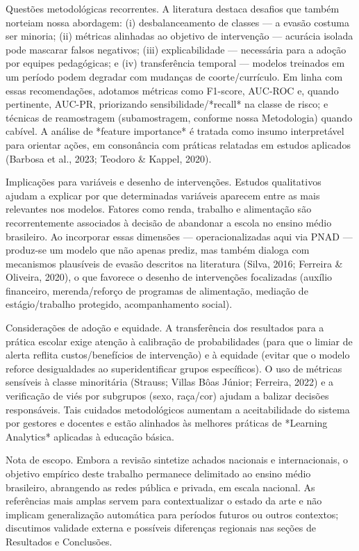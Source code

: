 \documentclass[english, spanish, brazilian]{RBIEarticle} %
\begin{document}
Questões metodológicas recorrentes. A literatura destaca desafios que também norteiam nossa
abordagem: (i) desbalanceamento de classes — a evasão costuma ser minoria; (ii) métricas
alinhadas ao objetivo de intervenção — acurácia isolada pode mascarar falsos negativos; (iii)
explicabilidade — necessária para a adoção por equipes pedagógicas; e (iv) transferência temporal
— modelos treinados em um período podem degradar com mudanças de coorte/currículo. Em linha
com essas recomendações, adotamos métricas como F1-score, AUC-ROC e, quando pertinente,
AUC-PR, priorizando sensibilidade/*recall* na classe de risco; e técnicas de reamostragem
(subamostragem, conforme nossa Metodologia) quando cabível. A análise de *feature importance*
é tratada como insumo interpretável para orientar ações, em consonância com práticas relatadas em
estudos aplicados (Barbosa et al., 2023; Teodoro \& Kappel, 2020).

Implicações para variáveis e desenho de intervenções. Estudos qualitativos ajudam a explicar por
que determinadas variáveis aparecem entre as mais relevantes nos modelos. Fatores como renda,
trabalho e alimentação são recorrentemente associados à decisão de abandonar a escola no ensino
médio brasileiro. Ao incorporar essas dimensões — operacionalizadas aqui via PNAD — produz-se
um modelo que não apenas prediz, mas também dialoga com mecanismos plausíveis de evasão
descritos na literatura (Silva, 2016; Ferreira \& Oliveira, 2020), o que favorece o desenho de
intervenções focalizadas (auxílio financeiro, merenda/reforço de programas de alimentação,
mediação de estágio/trabalho protegido, acompanhamento social).

Considerações de adoção e equidade. A transferência dos resultados para a prática escolar exige
atenção à calibração de probabilidades (para que o limiar de alerta reflita custos/benefícios de
intervenção) e à equidade (evitar que o modelo reforce desigualdades ao superidentificar grupos
específicos). O uso de métricas sensíveis à classe minoritária (Strauss; Villas Bôas Júnior;
Ferreira, 2022) e a verificação de viés por subgrupos (sexo, raça/cor) ajudam a balizar decisões
responsáveis. Tais cuidados metodológicos aumentam a aceitabilidade do sistema por gestores e
docentes e estão alinhados às melhores práticas de *Learning Analytics* aplicadas à educação
básica.

Nota de escopo. Embora a revisão sintetize achados nacionais e internacionais, o objetivo empírico
deste trabalho permanece delimitado ao ensino médio brasileiro, abrangendo as redes pública e
privada, em escala nacional. As referências mais amplas servem para contextualizar o estado da
arte e não implicam generalização automática para períodos futuros ou outros contextos;
discutimos validade externa e possíveis diferenças regionais nas seções de Resultados e
Conclusões.
\end{document}
